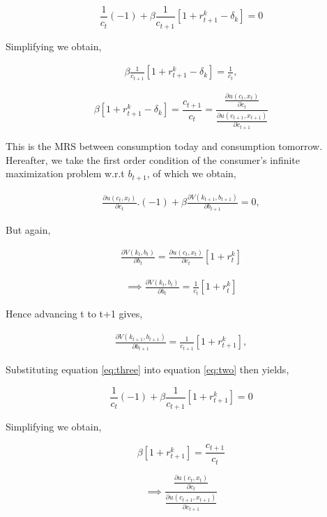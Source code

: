 \documentclass[
  11pt,
  justified]{article}
\begin{document}
\[
\frac{1}{c_t} (-1) + \beta \frac{1}{c_{t+1}} [1 + r_{t+1}^k - \delta_k] = 0
\]

Simplifying we obtain,

\begin{align}
\beta \frac{1}{c_{t+1}} [1 + r_{t+1}^k - \delta_k] = \frac{1}{c_t}, \tag{Euler equation}
\end{align}

\[
\beta [1 + r_{t+1}^k - \delta_k] = \frac{c_{t+1}}{c_t} = \frac{\frac{\partial u(c_t, x_t)}{\partial c_t}}{\frac{\partial u(c_{t+1}, x_{t+1})}{\partial c_{t+1}}}
\]

This is the MRS between consumption today and consumption tomorrow.
Hereafter, we take the first order condition of the consumer's infinite
maximization problem w.r.t \(b_{t+1}\), of which we obtain,

\begin{align}
\frac{\partial u(c_t, x_t)}{\partial c_t} . (-1) + \beta \frac{\partial V(k_{t+1}, b_{t+1})}{\partial b_{t+1}} = 0, \tag{2} \label{eq:two}
\end{align}

But again,

\begin{align}
\frac{\partial V(k_{t}, b_{t})}{\partial b_{t}} = \frac{\partial u(c_t, x_t)}{\partial c_t} [1 + r_t^k] \tag{by envelope condition}
\end{align}

\begin{align}
\implies \frac{\partial V(k_{t}, b_{t})}{\partial b_{t}} = \frac{1}{ c_t} [1 + r_t^k] \tag{using MU of consumption}
\end{align}

Hence advancing t to t+1 gives,

\begin{align}
\frac{\partial V(k_{t+1}, b_{t+1})}{\partial b_{t+1}} =  \frac{1}{c_{t+1}} [1 + r_{t+1}^k], \tag{3} \label{eq:three}
\end{align}

Substituting equation \ref{eq:three} into equation \ref{eq:two} then
yields,

\[
\frac{1}{c_t} (-1) + \beta \frac{1}{c_{t+1}} [1 + r_{t+1}^k] = 0
\]

Simplifying we obtain,

\[
\beta [1 + r_{t+1}^k] = \frac{c_{t+1}}{c_t}  
\]

\[
\implies \frac{\frac{\partial u(c_t, x_t)}{\partial c_t}}{\frac{\partial u(c_{t+1}, x_{t+1})}{\partial c_{t+1}}}
\]
\end{document}
